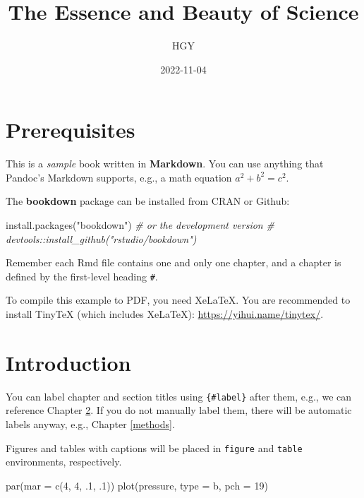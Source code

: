 \documentclass[
]{book}
\title{The Essence and Beauty of Science}
\author{HGY}
\date{2022-11-04}
\newenvironment{Shaded}{\begin{snugshade}}{\end{snugshade}}
\newcommand{\AttributeTok}[1]{\textcolor[rgb]{0.77,0.63,0.00}{#1}}
\newcommand{\CommentTok}[1]{\textcolor[rgb]{0.56,0.35,0.01}{\textit{#1}}}
\newcommand{\DecValTok}[1]{\textcolor[rgb]{0.00,0.00,0.81}{#1}}
\newcommand{\FunctionTok}[1]{\textcolor[rgb]{0.00,0.00,0.00}{#1}}
\newcommand{\NormalTok}[1]{#1}
\newcommand{\StringTok}[1]{\textcolor[rgb]{0.31,0.60,0.02}{#1}}
\begin{document}
\maketitle

{
\setcounter{tocdepth}{1}
\tableofcontents
}
\hypertarget{prerequisites}{%
\chapter{Prerequisites}\label{prerequisites}}

This is a \emph{sample} book written in \textbf{Markdown}. You can use anything that Pandoc's Markdown supports, e.g., a math equation \(a^2 + b^2 = c^2\).

The \textbf{bookdown} package can be installed from CRAN or Github:

\begin{Shaded}
\begin{Highlighting}[]
\FunctionTok{install.packages}\NormalTok{(}\StringTok{"bookdown"}\NormalTok{)}
\CommentTok{\# or the development version}
\CommentTok{\# devtools::install\_github("rstudio/bookdown")}
\end{Highlighting}
\end{Shaded}

Remember each Rmd file contains one and only one chapter, and a chapter is defined by the first-level heading \texttt{\#}.

To compile this example to PDF, you need XeLaTeX. You are recommended to install TinyTeX (which includes XeLaTeX): \url{https://yihui.name/tinytex/}.

\hypertarget{intro}{%
\chapter{Introduction}\label{intro}}

You can label chapter and section titles using \texttt{\{\#label\}} after them, e.g., we can reference Chapter \ref{intro}. If you do not manually label them, there will be automatic labels anyway, e.g., Chapter \ref{methods}.

Figures and tables with captions will be placed in \texttt{figure} and \texttt{table} environments, respectively.

\begin{Shaded}
\begin{Highlighting}[]
\FunctionTok{par}\NormalTok{(}\AttributeTok{mar =} \FunctionTok{c}\NormalTok{(}\DecValTok{4}\NormalTok{, }\DecValTok{4}\NormalTok{, .}\DecValTok{1}\NormalTok{, .}\DecValTok{1}\NormalTok{))}
\FunctionTok{plot}\NormalTok{(pressure, }\AttributeTok{type =} \StringTok{\textquotesingle{}b\textquotesingle{}}\NormalTok{, }\AttributeTok{pch =} \DecValTok{19}\NormalTok{)}
\end{Highlighting}
\end{Shaded}
\end{document}
